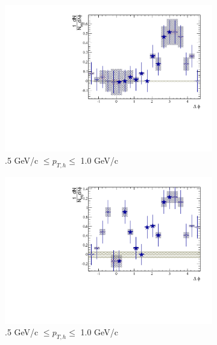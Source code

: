 \begin{figure}[htbp]
	\begin{subfigure}{0.5\textwidth}
		\includegraphics[width=\textwidth]{Plots/Correlations/subtracted/NPE_eh_corr_subtracted_primpt_4_5_cent_2_3_assopt_1_1.pdf}
		\caption{.5 GeV/c $\leq p_{T,h} \leq$ 1.0 GeV/c}
		\label{fig:Sub4060a}
	\end{subfigure}	
	\begin{subfigure}{0.5\textwidth}
		\includegraphics[width=\textwidth]{Plots/Correlations/subtracted/NPE_eh_corr_subtracted_primpt_6_8_cent_2_3_assopt_1_1.pdf}
		\caption{.5 GeV/c $\leq p_{T,h} \leq$ 1.0 GeV/c}
		\label{fig:Sub4060b}
	\end{subfigure}	
	\begin{subfigure}{0.5\textwidth}

\end{subfigure}
\end{figure}
